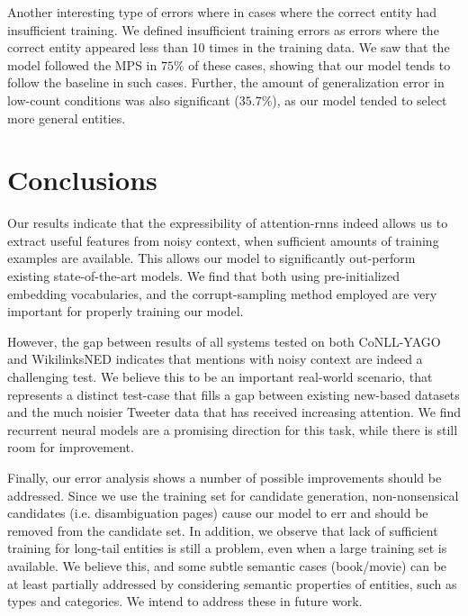 \documentclass[11pt]{article}
\begin{document}
	Another interesting type of errors where in cases where the correct entity had insufficient training. We defined insufficient training errors as errors where the correct entity appeared less than 10 times in the training data. We saw that the model followed the MPS in $75$\% of these cases, showing that our model tends to follow the baseline in such cases. Further, the amount of generalization error in low-count conditions was also significant ($35.7\%$), as our model tended to select more general entities.
	
	\section{Conclusions}
	Our results indicate that the expressibility of attention-rnns indeed allows us to extract useful features from noisy context, when sufficient amounts of training examples are available. This allows our model to significantly out-perform existing state-of-the-art models. We find that both using pre-initialized embedding vocabularies, and the corrupt-sampling method employed are very important for properly training our model.
	
	However, the gap between results of all systems tested on both CoNLL-YAGO and WikilinksNED indicates that mentions with noisy context are indeed a challenging test. We believe this to be an important real-world scenario, that represents a distinct test-case that fills a gap between existing new-based datasets and the much noisier Tweeter data that has received increasing attention. We find recurrent neural models are a promising direction for this task, while there is still room for improvement. 
	
	Finally, our error analysis shows a number of possible improvements should be addressed. Since we use the training set for candidate generation, non-nonsensical candidates (i.e. disambiguation pages) cause our model to err and should be removed from the candidate set. In addition, we observe that lack of sufficient training for long-tail entities is still a problem, even when a large training set is available. We believe this, and some subtle semantic cases (book/movie) can be at least partially addressed by considering semantic properties of entities, such as types and categories. We intend to address these in future work.
	
	
	
	
\end{document}
